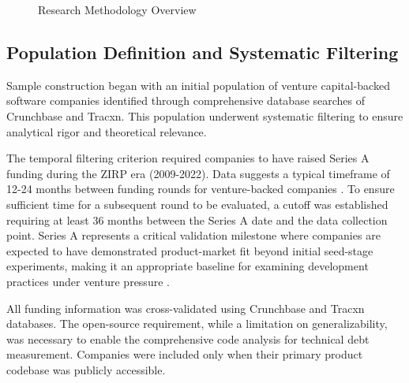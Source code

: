 \begin{figure}[htbp]
\caption{Research Methodology Overview}
\label{fig:methodology_overview}
\end{figure}

\subsection{Population Definition and Systematic Filtering}

Sample construction began with an initial population of venture capital-backed software companies identified through comprehensive database searches of Crunchbase and Tracxn. This population underwent systematic filtering to ensure analytical rigor and theoretical relevance.

The temporal filtering criterion required companies to have raised Series A funding during the ZIRP era (2009-2022). Data suggests a typical timeframe of 12-24 months between funding rounds for venture-backed companies \cite{gornall2020squaring}. To ensure sufficient time for a subsequent round to be evaluated, a cutoff was established requiring at least 36 months between the Series A date and the data collection point. Series A represents a critical validation milestone where companies are expected to have demonstrated product-market fit beyond initial seed-stage experiments, making it an appropriate baseline for examining development practices under venture pressure \cite{sahlman1990structure}.

All funding information was cross-validated using Crunchbase and Tracxn databases. The open-source requirement, while a limitation on generalizability, was necessary to enable the comprehensive code analysis for technical debt measurement. Companies were included only when their primary product codebase was publicly accessible.

